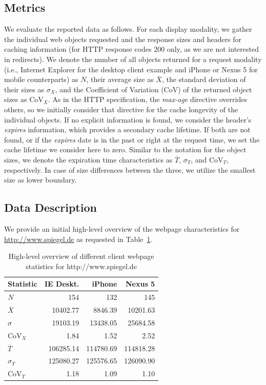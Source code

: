 \documentclass[letterpaper,conference]{IEEEtran}
\begin{document}
\subsection{Metrics}
We evaluate the reported data as follows. For each display modality, we gather the individual web objects requested and the response sizes and headers for caching information (for HTTP response codes 200 only, as we are not interested in redirects).
We denote the number of all objects returned for a request modality (i.e., Internet Explorer for the desktop client example and iPhone or Nexus 5 for mobile counterparts) as $N$, their average size as $\overline{X}$, the standard deviation of their sizes as ${\sigma}_{X}$, and the Coefficient of Variation (CoV) of the returned object sizes as $\mathrm{CoV}_{X}$. As in the HTTP specification, the \emph{max-age} directive overrides others, so we initially consider that directive for the cache longevity of the individual objects. If no explicit information is found, we consider the header's \emph{expires} information, which provides a secondary cache lifetime. If both are not found, or if the \emph{expires} date is in the past or right at the request time, we set the cache lifetime we consider here to zero. 
Similar to the notation for the object sizes, we denote the expiration time characteristics as $\overline{T}$, $\sigma_{T}$, and $\mathrm{CoV}_{T}$, respectively.
In case of size differences between the three, we utilize the smallest size as lower boundary.


\subsection{Data Description}

We provide an initial high-level overview of the webpage characteristics for \url{http://www.spiegel.de} as requested in Table~\ref{tab:spiegel}.
\begin{table}
\centering
\caption{High-level overview of different client webpage statistics for http://www.spiegel.de}
\label{tab:spiegel}
\begin{tabular}{|l|r|r|r|}
	\hline
	Statistic          & IE Deskt. &    iPhone &   Nexus 5 \\ \hline
	$N$                &       154 &       132 &       145 \\ \hline\hline
	$\overline{X}$     &  10402.77 &   8846.39 &  10201.63 \\ \hline
	$\sigma$           &  19103.19 &  13438.05 &  25684.58 \\ \hline
	$\mathrm{CoV}_{X}$ &      1.84 &      1.52 &      2.52 \\ \hline\hline
	$\overline{T}$     & 106285.14 & 114780.69 & 114818.28 \\ \hline
	$\sigma_{T}$       & 125080.27 & 125576.65 & 126090.90 \\ \hline
	$\mathrm{CoV}_{T}$ &      1.18 &      1.09 &      1.10 \\ \hline
\end{tabular}
\end{table}
\end{document}

